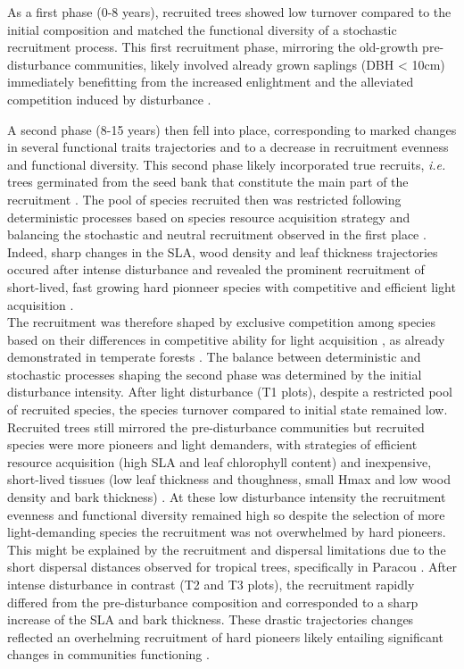 \documentclass[fleqn,10pt]{ArtEcoFoG} %
\begin{document}
As a first phase (0-8 years), recruited trees showed low turnover
compared to the initial composition and matched the functional diversity
of a stochastic recruitment process. This first recruitment phase,
mirroring the old-growth pre-disturbance communities, likely involved
already grown saplings (DBH \textless{} 10cm) immediately benefitting
from the increased enlightment and the alleviated competition induced by
disturbance \citep{Herault2010}.

A second phase (8-15 years) then fell into place, corresponding to
marked changes in several functional traits trajectories and to a
decrease in recruitment evenness and functional diversity. This second
phase likely incorporated true recruits, \emph{i.e.} trees germinated
from the seed bank that constitute the main part of the recruitment
\citep{Lawton1988}. The pool of species recruited then was restricted
following deterministic processes based on species resource acquisition
strategy and balancing the stochastic and neutral recruitment observed
in the first place \citep{Chave2004}. Indeed, sharp changes in the SLA,
wood density and leaf thickness trajectories occured after intense
disturbance and revealed the prominent recruitment of short-lived, fast
growing hard pionneer species with competitive and efficient light
acquisition \citep{Wright2004, Chave2009b, Herault2011, Reich2014}.\\
The recruitment was therefore shaped by exclusive competition among
species based on their differences in competitive ability for light
acquisition \citep{Mayfield2010}, as already demonstrated in temperate
forests \citep{Kunstler2012}. The balance between deterministic and
stochastic processes shaping the second phase was determined by the
initial disturbance intensity. After light disturbance (T1 plots),
despite a restricted pool of recruited species, the species turnover
compared to initial state remained low. Recruited trees still mirrored
the pre-disturbance communities but recruited species were more pioneers
and light demanders, with strategies of efficient resource acquisition
(high SLA and leaf chlorophyll content) and inexpensive, short-lived
tissues (low leaf thickness and thoughness, small Hmax and low wood
density and bark thickness)
\citep{Hubbell1999, Schnitzer2001, Sheil2003, Bongers2009}. At these low
disturbance intensity the recruitment evenness and functional diversity
remained high so despite the selection of more light-demanding species
the recruitment was not overwhelmed by hard pioneers. This might be
explained by the recruitment and dispersal limitations due to the short
dispersal distances observed for tropical trees, specifically in Paracou
\citep{Leclerc2015, Scotti2015a}. After intense disturbance in contrast
(T2 and T3 plots), the recruitment rapidly differed from the
pre-disturbance composition and corresponded to a sharp increase of the
SLA and bark thickness. These drastic trajectories changes reflected an
overhelming recruitment of hard pioneers likely entailing significant
changes in communities functioning \citep{Diaz2005}.
\end{document}
